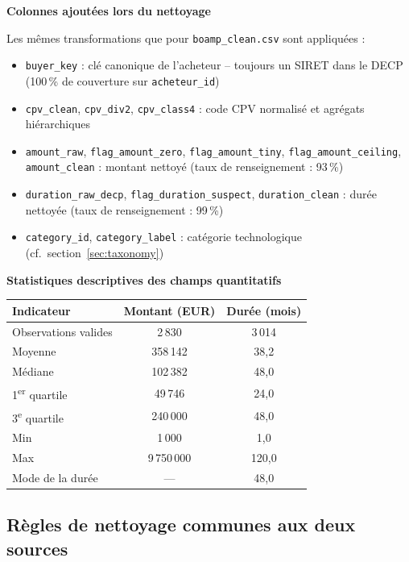 \documentclass[12pt,a4paper]{article}
\begin{document}
\medskip
\textbf{Colonnes ajoutées lors du nettoyage}

Les mêmes transformations que pour \texttt{boamp\_clean.csv} sont appliquées :

\begin{itemize}
  \item[---] \texttt{buyer\_key} : clé canonique de l'acheteur -- toujours un
    SIRET dans le DECP (100\,\% de couverture sur \texttt{acheteur\_id})
  \item[---] \texttt{cpv\_clean}, \texttt{cpv\_div2}, \texttt{cpv\_class4} :
    code CPV normalisé et agrégats hiérarchiques
  \item[---] \texttt{amount\_raw}, \texttt{flag\_amount\_zero},
    \texttt{flag\_amount\_tiny}, \texttt{flag\_amount\_ceiling},
    \texttt{amount\_clean} : montant nettoyé (taux de renseignement : 93\,\%)
  \item[---] \texttt{duration\_raw\_decp}, \texttt{flag\_duration\_suspect},
    \texttt{duration\_clean} : durée nettoyée (taux de renseignement : 99\,\%)
  \item[---] \texttt{category\_id}, \texttt{category\_label} : catégorie
    technologique (cf.\ section~\ref{sec:taxonomy})
\end{itemize}

\medskip
\textbf{Statistiques descriptives des champs quantitatifs}

\begin{center}
\begin{tabular}{lcc}
\toprule
\textbf{Indicateur} & \textbf{Montant (EUR)} &
  \textbf{Durée (mois)} \\
\midrule
Observations valides & 2\,830 & 3\,014 \\
Moyenne              & 358\,142 & 38,2 \\
Médiane              & 102\,382 & 48,0 \\
1\textsuperscript{er} quartile & 49\,746 & 24,0 \\
3\textsuperscript{e} quartile  & 240\,000 & 48,0 \\
Min                  & 1\,000     & 1,0 \\
Max                  & 9\,750\,000 & 120,0 \\
Mode de la durée     & ---      & 48,0 \\
\bottomrule
\end{tabular}
\end{center}

\subsection{Règles de nettoyage communes aux deux sources}
\end{document}
